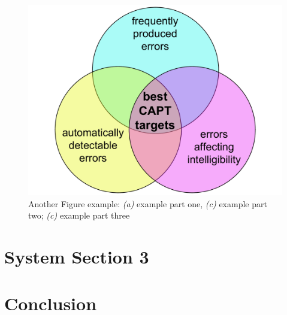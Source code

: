 \begin{figure}[htb]
	\includegraphics[width=\textwidth]{../img/error-venn}
	\caption{Another Figure example: \textit{(a)} example part one, \textit{(c)} example part two; \textit{(c)} example part three}
	\label{fig:system:example2}
\end{figure}

\Blindtext[2][2]

\section{System Section 3}
\label{sec:system:sec3}

\Blindtext[4][2]

\section{Conclusion}
\label{sec:system:conclusion}

\Blindtext[2][1]
